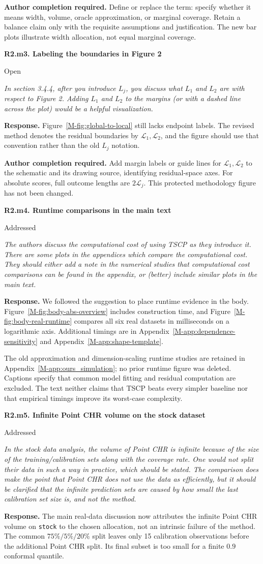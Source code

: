 \documentclass[11pt]{article}
\newcommand{\msapp}[1]{Appendix~\ref*{M-#1}}
\newcommand{\msfig}[1]{Figure~\ref*{M-#1}}
\newcommand{\action}[1]{\par{\small\color{ActionRed}\textbf{Author completion required.} #1\par}}
\newcommand{\point}[3]{\par\Needspace{7\baselineskip}\medskip
\noindent\parbox[t]{0.77\linewidth}{\textbf{#1}}\hfill
\parbox[t]{0.21\linewidth}{\raggedleft\small\sffamily #2}\par\nopagebreak
{\color{ReviewerBlue}\small\itshape #3\par}\textbf{Response.} }
\begin{document}
\action{Define or replace the term: specify whether it means width, volume, oracle approximation, or marginal coverage. Retain a balance claim only with the requisite assumptions and justification. The new bar plots illustrate width allocation, not equal marginal coverage.}

\point{R2.m3. Labeling the boundaries in Figure 2}{Open}{In section 3.4.4, after you introduce $L_j$, you discuss what
$L_1$ and $L_2$ are with respect to Figure 2. Adding $L_1$ and
$L_2$ to the margins (or with a dashed line across the plot)
would be a helpful visualization.}
\label{response:R2.m3}
\msfig{fig:global-to-local} still lacks endpoint labels. The revised method denotes the residual boundaries by $\mathcal L_1,\mathcal L_2$, and the figure should use that convention rather than the old $L_j$ notation.

\action{Add margin labels or guide lines for $\mathcal L_1,\mathcal L_2$ to the schematic and its drawing source, identifying residual-space axes. For absolute scores, full outcome lengths are $2\mathcal L_j$. This protected methodology figure has not been changed.}

\point{R2.m4. Runtime comparisons in the main text}{Addressed}{The authors discuss the computational cost of using TSCP as they
introduce it. There are some plots in the appendices which compare
the computational cost. They should either add a note in the
numerical studies that computational cost comparisons can be
found in the appendix, or (better) include similar plots in the
main text.}
\label{response:R2.m4}
We followed the suggestion to place runtime evidence in the body. \msfig{fig:body-abs-overview} includes construction time, and \msfig{fig:body-real-runtime} compares all six real datasets in milliseconds on a logarithmic axis. Additional timings are in \msapp{app:dependence-sensitivity} and \msapp{app:shape-template}.

The old approximation and dimension-scaling runtime studies are retained in \msapp{app:ours_simulation}; no prior runtime figure was deleted. Captions specify that common model fitting and residual computation are excluded. The text neither claims that TSCP beats every simpler baseline nor that empirical timings improve its worst-case complexity.

\point{R2.m5. Infinite Point CHR volume on the stock dataset}{Addressed}{In the stock data analysis, the volume of Point CHR is infinite
because of the size of the training/calibration sets along with
the coverage rate. One would not split their data in such a way
in practice, which should be stated. The comparison does make
the point that Point CHR does not use the data as efficiently,
but it should be clarified that the infinite prediction sets
are caused by how small the last calibration set size is, and
not the method.}
\label{response:R2.m5}
The main real-data discussion now attributes the infinite Point CHR volume on \texttt{stock} to the chosen allocation, not an intrinsic failure of the method. The common $75\%/5\%/20\%$ split leaves only 15 calibration observations before the additional Point CHR split. Its final subset is too small for a finite $0.9$ conformal quantile.
\end{document}
